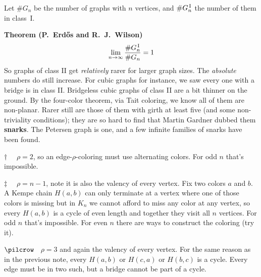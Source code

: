 \documentclass[12pt]{article}
\begin{document}
Let $\#G_n$ be the number of graphs with $n$ vertices,
and $\#G^{\,\rm I}_n$ the number of them in class~I.

{\bf Theorem (P.~Erd\H{o}s and R.~J.~Wilson)}$\quad$
$$
  \lim_{n\to\infty} {\#G^{\,\rm I}_n \over \#G_n} = 1
$$
So graphs of class II get {\em relatively\/} rarer for larger graph sizes. The {\em absolute\/} numbers do still increase. For cubic graphs for instance, we saw every one with a bridge is in class II. Bridgeless cubic graphs of class II are a bit thinner on the ground. By the four-color theorem, via Tait coloring, we know all of them are non-planar. Rarer still are those of them with girth at least five (and some non-triviality conditions); they are so hard to find that Martin Gardner dubbed them {\bf snarks}. The Petersen graph is one, and a few infinite families of snarks have been found.

{\footnotesize

$\dagger\quad$ $\rho=2$, so an edge-$\rho$-coloring must use alternating colors. For odd $n$ that's impossible.

$\ddagger\quad$ $\rho=n-1$, note it is also the valency of every vertex.
Fix two colors $a$ and $b$. A Kempe chain $H(a,b)$ can only terminate at a vertex where one of those colors is missing but in $K_n$ we cannot afford to miss any color at any vertex, so every $H(a,b)$ is a cycle of even length and together they visit all $n$ vertices. For odd $n$ that's impossible.
For even $n$ there are ways to construct the coloring (try it).

$\pilcrow\;\;$ $\rho = 3$ and again the valency of every vertex. For the same
reason as in the previous note, every $H(a,b)$ or $H(c,a)$ or $H(b,c)$ is a cycle. Every edge must be in two such, but a bridge cannot be part of a cycle.

}
\end{document}
